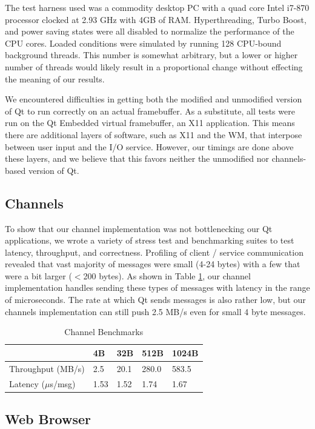 \documentclass[letterpaper,twocolumn,10pt]{article}
\begin{document}
The test harness used was a commodity desktop PC with a quad core Intel i7-870 processor clocked at 2.93 GHz with 4GB of RAM. Hyperthreading, Turbo Boost, and power saving states were all disabled to normalize the performance of the CPU cores. Loaded conditions were simulated by running 128 CPU-bound background threads. This number is somewhat arbitrary, but a lower or higher number of threads would likely result in a proportional change without effecting the meaning of our results.

We encountered difficulties in getting both the modified and unmodified version of Qt to run correctly on an actual framebuffer. As a substitute, all tests were run on the Qt Embedded virtual framebuffer, an X11 application. This means there are additional layers of software, such as X11 and the WM, that interpose between user input and the I/O service. However, our timings are done above these layers, and we believe that this favors neither the unmodified nor channels-based version of Qt.

\subsection{Channels}

To show that our channel implementation was not bottlenecking our Qt applications, we wrote a variety of stress test and benchmarking suites to test latency, throughput, and correctness. Profiling of client / service communication revealed that vast majority of messages were small (4-24 bytes) with a few that were a bit larger ($<$200 bytes). As shown in Table \ref{tab:channel}, our channel implementation handles sending these types of messages with latency in the range of microseconds. The rate at which Qt sends messages is also rather low, but our channels implementation can still push 2.5 MB/s even for small 4 byte messages.

\begin{table}[tp]
\caption{Channel Benchmarks}
\centering
\label{tab:channel}
\begin{tabular}{| l | l | l | l | l |}
\hline
						&4B 	& 32B	&512B	&1024B\\ \hline
Throughput (MB/s)		&2.5	&20.1	&280.0	&583.5\\
Latency ($\mu$s/msg)	&1.53	&1.52	&1.74	&1.67\\
\hline
\end{tabular}
\end{table}


\subsection{Web Browser}
\end{document}

